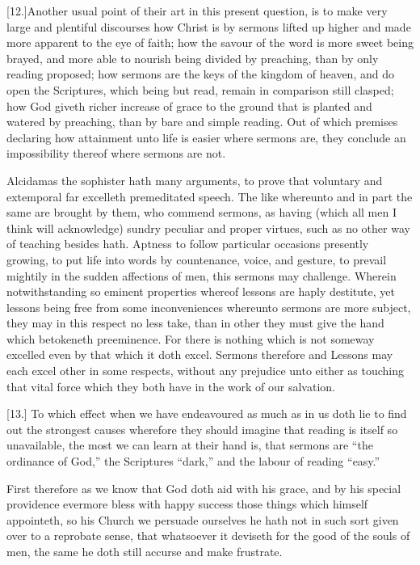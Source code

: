 [12.]Another usual point of their art in this present question, is to make very large and plentiful discourses how Christ is by sermons lifted up higher and made more apparent to the eye of faith; how the savour of the word is more sweet being brayed, and more able to nourish being divided by preaching, than by only reading proposed; how sermons are the keys of the kingdom of heaven, and do open the Scriptures, which being but read, remain in comparison still clasped; how God giveth richer increase of grace  to the ground that is planted and watered by preaching, than by bare and simple reading. Out of which premises declaring how attainment unto life is easier where sermons are, they conclude an impossibility thereof where sermons are not.

Alcidamas the sophister hath many arguments, to prove that voluntary and extemporal far excelleth premeditated speech. The like whereunto and in part the same are brought by them, who commend sermons, as having (which all men I think will acknowledge) sundry peculiar and proper virtues, such as no other way of teaching besides hath. Aptness to follow particular occasions presently growing, to put life into words by countenance, voice, and gesture, to prevail mightily in the sudden affections of men, this sermons may challenge. Wherein notwithstanding so eminent properties whereof lessons are haply destitute, yet lessons being free from some inconveniences whereunto sermons are more subject, they may in this respect no less take, than in other they must give the hand which betokeneth preeminence. For there is nothing which is not someway excelled even by that which it doth excel. Sermons therefore and Lessons may each excel other in some respects, without any prejudice unto either as touching that vital force which they both have in the work of our salvation.




[13.] To which effect when we have endeavoured as much as in us doth lie to find out the strongest causes wherefore they should imagine that reading is itself so unavailable, the most we can learn at their hand is, that sermons are “the ordinance of God,” the Scriptures “dark,” and the labour of reading “easy.”

First therefore as we know that God doth aid with his grace, and by his special providence evermore bless with happy success those things which himself appointeth, so his Church we persuade ourselves he hath not in such sort given over to a reprobate sense, that whatsoever it deviseth for the good of the souls of men, the same he doth still accurse and make frustrate.

